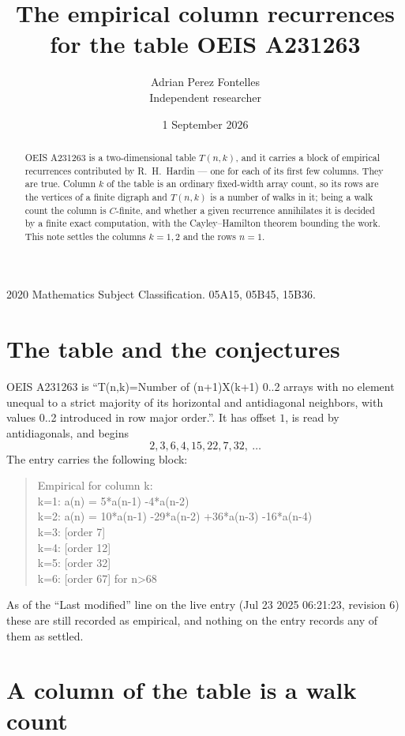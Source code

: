 \documentclass[11pt,a4paper]{article}
\title{The empirical column recurrences for the table OEIS A231263}
\author{Adrian Perez Fontelles\\ \small Independent researcher}
\date{1 September 2026}
\theoremstyle{plain}
\theoremstyle{definition}
\begin{document}
\maketitle

\begin{abstract}
OEIS A231263 is a two-dimensional table $T(n,k)$, and it carries a block of empirical
recurrences contributed by R.~H.~Hardin --- one for each of its first few columns. They are
true. Column $k$ of the table is an ordinary fixed-width array count, so its rows are the
vertices of a finite digraph and $T(n,k)$ is a number of walks in it; being a walk count the
column is $C$-finite, and whether a given recurrence annihilates it is decided by a finite
exact computation, with the Cayley--Hamilton theorem bounding the work. This note settles the columns $k=1, 2$ and the rows $n=1$.
\end{abstract}

\noindent\small 2020 Mathematics Subject Classification. 05A15, 05B45, 15B36.\normalsize

\section{The table and the conjectures}

OEIS A231263 is ``T(n,k)=Number of (n+1)X(k+1) 0..2 arrays with no element unequal to a strict majority of its horizontal and antidiagonal neighbors, with values 0..2 introduced in row major order.''. It has offset $1$, is
read by antidiagonals, and begins
\[
2, 3, 6, 4, 15, 22, 7, 32,\ \dots
\]
The entry carries the following block:
\begin{quote}\small
Empirical for column k:\\
k=1: a(n) = 5*a(n-1) -4*a(n-2)\\
k=2: a(n) = 10*a(n-1) -29*a(n-2) +36*a(n-3) -16*a(n-4)\\
k=3: [order 7]\\
k=4: [order 12]\\
k=5: [order 32]\\
k=6: [order 67] for n>68\\
\end{quote}
As of the ``Last modified'' line on the live entry (Jul 23 2025 06:21:23, revision 6) these are still
recorded as empirical, and nothing on the entry records any of them as settled.

\section{A column of the table is a walk count}
\end{document}
